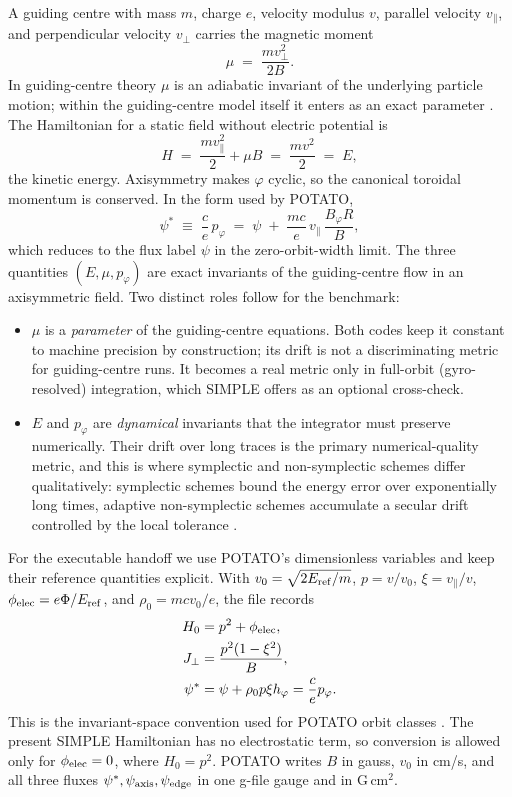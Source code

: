 \documentclass[11pt,a4paper]{article}
\begin{document}
A guiding centre with mass $m$, charge $e$, velocity modulus $v$, parallel
velocity $v_\parallel$, and perpendicular velocity $v_\perp$ carries the
magnetic moment
\begin{equation}
  \mu \;=\; \frac{m v_\perp^2}{2B}.
\end{equation}
In guiding-centre theory $\mu$ is an adiabatic invariant of the underlying
particle motion; within the guiding-centre model itself it enters as an exact
parameter \citep{littlejohn1983}. The Hamiltonian for a static field without
electric potential is
\begin{equation}
  H \;=\; \frac{m v_\parallel^2}{2} + \mu B \;=\; \frac{m v^2}{2} \;=\; E,
  \label{eq:H}
\end{equation}
the kinetic energy. Axisymmetry makes $\varphi$ cyclic, so the canonical
toroidal momentum is conserved. In the form used by POTATO,
\begin{equation}
  \psi^* \;\equiv\; \frac{c}{e}\,p_\varphi
  \;=\; \psi \;+\; \frac{m c}{e}\, v_\parallel\, \frac{B_\varphi R}{B},
  \label{eq:pphi}
\end{equation}
which reduces to the flux label $\psi$ in the zero-orbit-width limit. The
three quantities $(E, \mu, p_\varphi)$ are exact invariants of the
guiding-centre flow in an axisymmetric field. Two distinct roles follow for
the benchmark:
\begin{itemize}
\item $\mu$ is a \emph{parameter} of the guiding-centre equations. Both codes
  keep it constant to machine precision by construction; its drift is not a
  discriminating metric for guiding-centre runs. It becomes a real metric only
  in full-orbit (gyro-resolved) integration, which SIMPLE offers as an
  optional cross-check.
\item $E$ and $p_\varphi$ are \emph{dynamical} invariants that the integrator
  must preserve numerically. Their drift over long traces is the primary
  numerical-quality metric, and this is where symplectic and non-symplectic
  schemes differ qualitatively: symplectic schemes bound the energy error over
  exponentially long times, adaptive non-symplectic schemes accumulate a
  secular drift controlled by the local tolerance \citep{albert2020jcp}.
\end{itemize}

For the executable handoff we use POTATO's dimensionless variables and keep
their reference quantities explicit. With
$v_0=\sqrt{2E_{\rm ref}/m}$, $p=v/v_0$,
$\xi=v_\parallel/v$, $\phi_{\rm elec}=e\Phi/E_{\rm ref}$, and
$\rho_0=mc v_0/e$, the file records
\begin{align}
  H_0 &= p^2 + \phi_{\rm elec}, \\
  J_\perp &= \frac{p^2(1-\xi^2)}{B}, \\
  \psi^* &= \psi + \rho_0 p\xi h_\varphi = \frac{c}{e}p_\varphi .
\end{align}
This is the invariant-space convention used for POTATO orbit classes
\citep{buchholz2022}. The present SIMPLE Hamiltonian has no electrostatic
term, so conversion is allowed only for $\phi_{\rm elec}=0$, where
$H_0=p^2$. POTATO writes $B$ in gauss, $v_0$ in cm/s, and all three fluxes
$\psi^*,\psi_{\rm axis},\psi_{\rm edge}$ in one g-file gauge and in
G\,cm$^2$.
\end{document}
